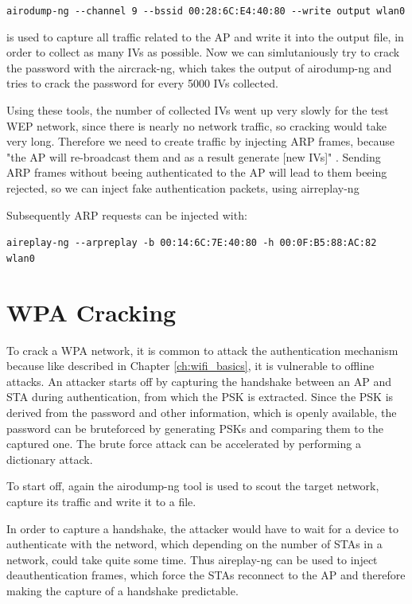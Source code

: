\lstinline[]|airodump-ng --channel 9 --bssid 00:28:6C:E4:40:80 --write output wlan0|

is used to capture all traffic related to the AP and write it into the output file, in order to collect as many IVs as possible.
Now we can simlutaniously try to crack the password with the aircrack-ng, which takes the output of airodump-ng and tries to crack the password for every 5000 IVs collected.


Using these tools, the number of collected IVs went up very slowly for the test WEP network, since there is nearly no network traffic, so cracking would take very long.
Therefore we need to create traffic by injecting ARP frames, because "the AP will re-broadcast them and as a result generate [new IVs]" \cite{Oriyano_2017}.
Sending ARP frames without beeing authenticated to the AP will lead to them beeing rejected, so we can inject fake authentication packets, using airreplay-ng


Subsequently ARP requests can be injected with:

\lstinline[]|aireplay-ng --arpreplay -b 00:14:6C:7E:40:80 -h 00:0F:B5:88:AC:82 wlan0|


\section{WPA Cracking}
To crack a WPA network, it is common to attack the authentication mechanism because like described in Chapter \cref{ch:wifi_basics}, it is vulnerable to offline attacks.
An attacker starts off by capturing the handshake between an AP and STA during authentication, from which the PSK is extracted.
Since the PSK is derived from the password and other information, which is openly available, the password can be bruteforced by generating PSKs and comparing them to the captured one.
The brute force attack can be accelerated by performing a dictionary attack.

To start off, again the airodump-ng tool is used to scout the target network, capture its traffic and write it to a file.


In order to capture a handshake, the attacker would have to wait for a device to authenticate with the netword, which depending on the number of STAs in a network, could take quite some time.
Thus aireplay-ng can be used to inject deauthentication frames, which force the STAs reconnect to the AP and therefore making the capture of a handshake predictable.


